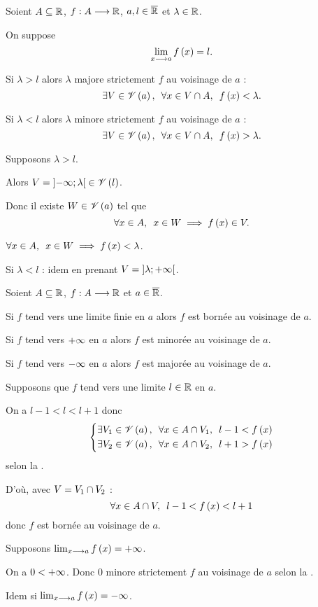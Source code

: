 \begin{prop}
Soient \(A\subseteq\mathbb{R}\), \(f:A\longrightarrow\mathbb{R}\), \(a,l\in\overline{\mathbb{R}}\) et \(\lambda\in\mathbb{R}\).

On suppose \[\lim_{x\longrightarrow a}f\left(x\right)=l.\]

Si \(\lambda>l\) alors \(\lambda\) majore strictement \(f\) au voisinage de \(a\) : \[\quantifs{\exists V\in\V{a};\forall x\in V\inter A}f\paren{x}<\lambda.\]

Si \(\lambda<l\) alors \(\lambda\) minore strictement \(f\) au voisinage de \(a\) : \[\quantifs{\exists V\in\V{a};\forall x\in V\inter A}f\paren{x}>\lambda.\]
\end{prop}

\begin{dem}
Supposons \(\lambda>l\).

Alors \(V=\left]-\infty;\lambda\right[\in\mathscr{V}\left(l\right)\).

Donc il existe \(W\in\mathscr{V}\left(a\right)\) tel que \[\quantifs{\forall x\in A}x\in W\imp f\paren{x}\in V.\]

\Cad \(\quantifs{\forall x\in A}x\in W\imp f\paren{x}<\lambda\).

Si \(\lambda<l\) : idem en prenant \(V=\left]\lambda;+\infty\right[\).
\end{dem}

\begin{cor}
Soient \(A\subseteq\mathbb{R}\), \(f:A\longrightarrow\mathbb{R}\) et \(a\in\overline{\mathbb{R}}\).

Si \(f\) tend vers une limite finie en \(a\) alors \(f\) est bornée au voisinage de \(a\).

Si \(f\) tend vers \(+\infty\) en \(a\) alors \(f\) est minorée au voisinage de \(a\).

Si \(f\) tend vers \(-\infty\) en \(a\) alors \(f\) est majorée au voisinage de \(a\).
\end{cor}

\begin{dem}
Supposons que \(f\) tend vers une limite \(l\in\mathbb{R}\) en \(a\).

On a \(l-1<l<l+1\) donc \[\begin{dcases}\quantifs{\exists V_1\in\V{a};\forall x\in A\inter V_1}l-1<f\paren{x} \\ \quantifs{\exists V_2\in\V{a};\forall x\in A\inter V_2}l+1>f\paren{x}\end{dcases}\] selon la .

D'où, avec \(V=V_1\cap V_2\) : \[\quantifs{\forall x\in A\inter V}l-1<f\paren{x}<l+1\] donc \(f\) est bornée au voisinage de \(a\).

Supposons \(\lim_{x\longrightarrow a}f\left(x\right)=+\infty\).

On a \(0<+\infty\). Donc \(0\) minore strictement \(f\) au voisinage de \(a\) selon la .

Idem si \(\lim_{x\longrightarrow a}f\left(x\right)=-\infty\).
\end{dem}

